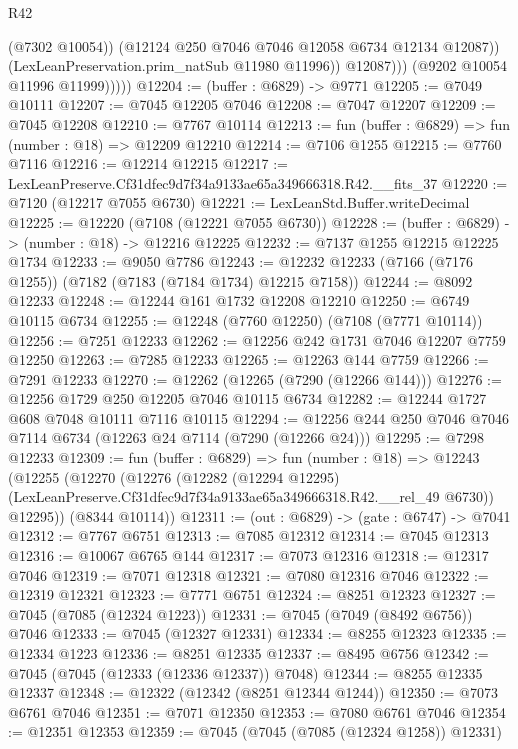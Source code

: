 \begin{lexlean}{R42}
\begin{coremodule}
{                        (@7302 @10054))
                      (@12124 @250 @7046 @7046 @12058 @6734 @12134 @12087))
                    (LexLeanPreservation.prim_natSub @11980 @11996))
                  @12087)))
            (@9202 @10054 @11996 @11999)))))
@12204 := (buffer : @6829) -> @9771
@12205 := @7049 @10111
@12207 := @7045 @12205 @7046
@12208 := @7047 @12207
@12209 := @7045 @12208
@12210 := @7767 @10114
@12213 := fun (buffer : @6829) => fun (number : @18) => @12209 @12210
@12214 := @7106 @1255
@12215 := @7760 @7116
@12216 := @12214 @12215
@12217 := LexLeanPreserve.Cf31dfec9d7f34a9133ae65a349666318.R42.__fits_37
@12220 := @7120 (@12217 @7055 @6730)
@12221 := LexLeanStd.Buffer.writeDecimal
@12225 := @12220 (@7108 (@12221 @7055 @6730))
@12228 := (buffer : @6829) -> (number : @18) -> @12216 @12225
@12232 := @7137 @1255 @12215 @12225 @1734
@12233 := @9050 @7786
@12243 := @12232 @12233 (@7166 (@7176 @1255)) (@7182 (@7183 (@7184 @1734) @12215 @7158))
@12244 := @8092 @12233
@12248 := @12244 @161 @1732 @12208 @12210
@12250 := @6749 @10115 @6734
@12255 := @12248 (@7760 @12250) (@7108 (@7771 @10114))
@12256 := @7251 @12233
@12262 := @12256 @242 @1731 @7046 @12207 @7759 @12250
@12263 := @7285 @12233
@12265 := @12263 @144 @7759
@12266 := @7291 @12233
@12270 := @12262 (@12265 (@7290 (@12266 @144)))
@12276 := @12256 @1729 @250 @12205 @7046 @10115 @6734
@12282 := @12244 @1727 @608 @7048 @10111 @7116 @10115
@12294 := @12256 @244 @250 @7046 @7046 @7114 @6734 (@12263 @24 @7114 (@7290 (@12266 @24)))
@12295 := @7298 @12233
@12309 := fun (buffer : @6829) =>
  fun (number : @18) =>
  @12243
    (@12255
      (@12270
        (@12276
          (@12282
            (@12294 @12295)
            (LexLeanPreserve.Cf31dfec9d7f34a9133ae65a349666318.R42.__rel_49 @6730))
          @12295))
      (@8344 @10114))
@12311 := (out : @6829) -> (gate : @6747) -> @7041
@12312 := @7767 @6751
@12313 := @7085 @12312
@12314 := @7045 @12313
@12316 := @10067 @6765 @144
@12317 := @7073 @12316
@12318 := @12317 @7046
@12319 := @7071 @12318
@12321 := @7080 @12316 @7046
@12322 := @12319 @12321
@12323 := @7771 @6751
@12324 := @8251 @12323
@12327 := @7045 (@7085 (@12324 @1223))
@12331 := @7045 (@7049 (@8492 @6756)) @7046
@12333 := @7045 (@12327 @12331)
@12334 := @8255 @12323
@12335 := @12334 @1223
@12336 := @8251 @12335
@12337 := @8495 @6756
@12342 := @7045 (@7045 (@12333 (@12336 @12337)) @7048)
@12344 := @8255 @12335 @12337
@12348 := @12322 (@12342 (@8251 @12344 @1244))
@12350 := @7073 @6761 @7046
@12351 := @7071 @12350
@12353 := @7080 @6761 @7046
@12354 := @12351 @12353
@12359 := @7045 (@7045 (@7085 (@12324 @1258)) @12331)
}
\end{coremodule}
\end{lexlean}
